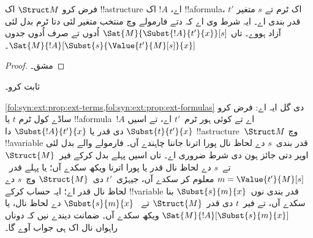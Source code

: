 \documentclass[../../../include/open-logic-section]{subfiles}
\begin{document}
\begin{prop} فرض کرو $\Struct M$ اک
!!a{structure} اے، $!A$ اک !!a{formula}، $t'$ اک ٹرم تے $s$
متغیر قدر بندی اے۔
ایہ شرط وی اے کہ دتے فارمولے وچ منتخب متغیر لئی دتا ٹرم بدل لئی
آزاد ہووے۔ تاں $\Sat{M}{\Subst{!A}{t'}{x}}[s]$ اُدوں تے
صرف اُدوں جدوں $\Sat{M}{!A}[\Subst{s}{\Value{t'}{M}[s]}{x}]$۔
\end{prop}

\begin{proof}
مشق۔
\end{proof}

\begin{prob}
 ثابت کرو۔
\end{prob}

\begin{explain}
  \cref{fol:syn:ext:prop:ext-terms,fol:syn:ext:prop:ext-formulas} دی
  گل ایہ اے: فرض کرو ساڈے کول ٹرم $t$ یا !!a{formula}~$!A$ اے
  تے کوئی ہور ٹرم~$t'$ اے، تے اسیں $\Subst{t}{t'}{x}$ دی قدر
  یا $\Subst{!A}{t'}{x}$ دا !!a{structure}~$\Struct M$
  وچ !!a{variable} قدر بندی~$s$ دے لحاظ نال پورا اترنا جاننا
  چاہندے آں۔ فارمولے والے بدل لئی اوپر دتی جائز ہون دی شرط ضروری
  اے۔ تاں اسیں پہلے بدل کرکے فیر~$\Struct{M}$ تے~$s$
  دے لحاظ نال قدر یا پورا اترنا ویکھ سکدے آں؛ یا پہلے قدر~$m = \Value{t'}{M}[s]$
  معلوم کر سکدے آں، جیہڑی~$t'$ دی~$\Struct{M}$ وچ~$s$ دے لحاظ
  نال قدر اے؛ ایہ حساب کرکے !!{variable} قدر بندی نوں~$\Subst{s}{m}{x}$
  بنا سکدے آں، تے فیر~$t$ دی قدر~$\Struct{M}$ تے
  ~$\Subst{s}{m}{x}$ دے لحاظ نال، یا
  $\Sat{M}{!A}[\Subst{s}{m}{x}]$ ویکھ سکدے آں۔
  ضمانت دیندے نیں کہ دوناں راہواں نال اک ہی جواب آوے گا۔
\end{explain}
\end{document}
